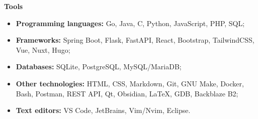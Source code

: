 {\vspace{0.5cm} \hspace{-0.5cm} \Large \textbf{Tools}}

\begin{itemize}
    \item \textbf{Programming languages:} Go, Java, C, Python, JavaScript, PHP, SQL;
    \item \textbf{Frameworks:} Spring Boot, Flask, FastAPI, React, Bootstrap, TailwindCSS, Vue, Nuxt, Hugo;
    \item \textbf{Databases:} SQLite, PostgreSQL, MySQL/MariaDB;
    \item \textbf{Other technologies:} HTML, CSS, Markdown, Git, GNU Make, Docker, Bash, Postman,
        REST API, Qt, Obsidian, LaTeX, GDB, Backblaze B2;
    \item \textbf{Text editors:} VS Code, JetBrains, Vim/Nvim, Eclipse.
\end{itemize}
